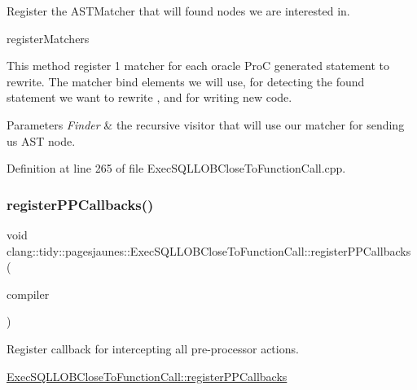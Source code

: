 Register the A\+S\+T\+Matcher that will found nodes we are interested in. 

register\+Matchers

This method register 1 matcher for each oracle ProC generated statement to rewrite. The matcher bind elements we will use, for detecting the found statement we want to rewrite , and for writing new code.


\begin{DoxyParams}{Parameters}
{\em Finder} & the recursive visitor that will use our matcher for sending us A\+ST node. \\
\hline
\end{DoxyParams}


Definition at line 265 of file Exec\+S\+Q\+L\+L\+O\+B\+Close\+To\+Function\+Call.\+cpp.

\mbox{\label{classclang_1_1tidy_1_1pagesjaunes_1_1_exec_s_q_l_l_o_b_close_to_function_call_a293550811c0d076f2ce34de80532c195}} 
\subsubsection{\texorpdfstring{register\+P\+P\+Callbacks()}{registerPPCallbacks()}}
{\footnotesize\ttfamily void clang\+::tidy\+::pagesjaunes\+::\+Exec\+S\+Q\+L\+L\+O\+B\+Close\+To\+Function\+Call\+::register\+P\+P\+Callbacks (\begin{DoxyParamCaption}\item[{Compiler\+Instance \&}]{compiler }\end{DoxyParamCaption})\hspace{0.3cm}{\ttfamily [override]}}



Register callback for intercepting all pre-\/processor actions. 

\hyperlink{classclang_1_1tidy_1_1pagesjaunes_1_1_exec_s_q_l_l_o_b_close_to_function_call_a293550811c0d076f2ce34de80532c195}{Exec\+S\+Q\+L\+L\+O\+B\+Close\+To\+Function\+Call\+::register\+P\+P\+Callbacks}

